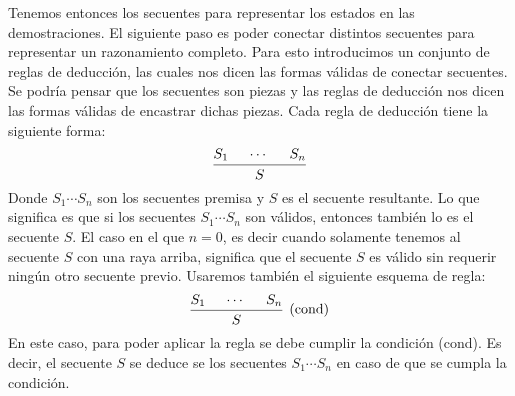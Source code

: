 \documentclass[a4paper, 12pt]{report}
\newcommand{\te}{\text}
\theoremstyle{definition}
\begin{document}
Tenemos entonces los secuentes para representar los estados en las demostraciones. El siguiente paso es poder conectar distintos secuentes para representar un razonamiento completo. Para esto introducimos un conjunto de reglas de deducción, las cuales nos dicen las formas válidas de conectar secuentes. Se podría pensar que los secuentes son piezas y las reglas de deducción nos dicen las formas válidas de encastrar dichas piezas. Cada regla de deducción tiene la siguiente forma:
$$\begin{prooftree}
	\hypo{S_1}\hypo{\cdots}\hypo{S_n}\infer3{S}
\end{prooftree}$$
Donde $S_1\cdots S_n$ son los secuentes premisa y $S$ es el secuente resultante. Lo que significa es que si los secuentes $S_1\cdots S_n$ son válidos, entonces también lo es el secuente $S$. El caso en el que $n=0$, es decir cuando solamente tenemos al secuente $S$ con una raya arriba, significa que el secuente $S$ es válido sin requerir ningún otro secuente previo. Usaremos también el siguiente esquema de regla:
$$\begin{prooftree}
	\hypo{S_1}\hypo{\cdots}\hypo{S_n}\infer3[(\te{cond})]{S}
\end{prooftree}$$
En este caso, para poder aplicar la regla se debe cumplir la condición (cond). Es decir, el secuente $S$ se deduce se los secuentes $S_1\cdots S_n$ en caso de que se cumpla la condición.
\end{document}
